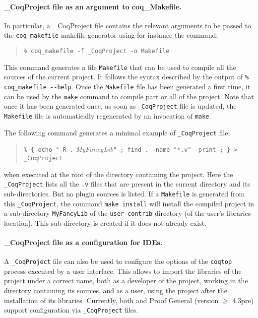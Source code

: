 \paragraph{\_CoqProject file as an argument to  coq\_Makefile.}
In particular, a \_CoqProject file contains the relevant
arguments to be passed to the \texttt{coq\_makefile} makefile
generator using for instance the command:

\begin{quotation}
\texttt{\% coq\_makefile -f \_CoqProject -o Makefile}
\end{quotation}

This command generates a file \texttt{Makefile} that can be used to
compile all the sources of the current project. It follows the
syntax described by the output of \texttt{\% coq\_makefile -{}-help}.
Once the \texttt{Makefile} file has been generated a first time, it
can be used by the \texttt{make} command to compile part or all of
the project. Note that once it has been generated once, as soon as
\texttt{\_CoqProject} file is updated, the \texttt{Makefile} file is
automatically regenerated by an invocation of \texttt{make}.

The following command generates a minimal example of
\texttt{\_CoqProject} file:
\begin{quotation}
\texttt{\% \{ echo "-R .} \textit{MyFancyLib}\texttt{" ; find . -name
  "*.v" -print ; \} > \_CoqProject}
\end{quotation}
when executed at the root of the directory containing the
project. Here the \texttt{\_CoqProject} lists all the \texttt{.v} files
that are present in the current directory and its sub-directories. But no
plugin sources is listed. If a \texttt{Makefile} is generated from
this \texttt{\_CoqProject}, the command \texttt{make install} will
install the compiled project in a sub-directory \texttt{MyFancyLib} of
the \texttt{user-contrib} directory  (of the user's {\Coq} libraries
location). This sub-directory is created if it does not already exist.

\paragraph{\_CoqProject file as a configuration for IDEs.}

A \texttt{\_CoqProject} file can also be used to configure the options
of the \texttt{coqtop} process executed by a user interface. This
allows to import the libraries of the project under a correct name,
both as a developer of the project, working in the directory
containing its sources, and as a user, using the project after
the installation of its libraries. Currently, both \CoqIDE{} and Proof
General (version $\geq$ 4.3pre) support configuration via
\texttt{\_CoqProject} files.

